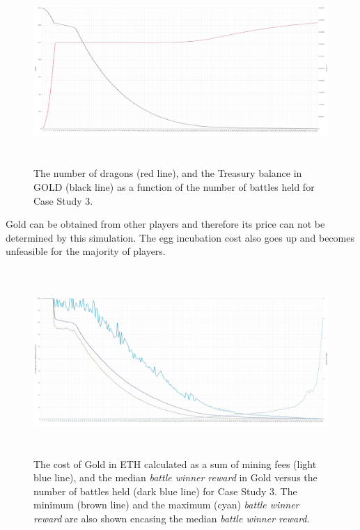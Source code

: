 \documentclass[12pt]{article}
\begin{document}
\begin{figure}[H]
	\begin{Center}
		\includegraphics[width=6.27in,height=2.78in]{./media/CS3nimage17.png}
		\caption{The number of dragons (red line), and the Treasury balance in GOLD (black line) as a function of the number of battles held for Case Study 3.}
		\label{fig:The number of dragons (red line), and the Treasury balance in Gold (black line) as a function of the number of battles held for Case Study 3.}
	\end{Center}
\end{figure}




Gold can be obtained from other players and therefore its price can not be determined by this simulation. The egg incubation cost also goes up and becomes unfeasible for the majority of players.\par




\begin{figure}[H]
	\begin{Center}
		\includegraphics[width=6.27in,height=2.78in]{./media/CS3nimage24.png}
        \caption{The cost of Gold in ETH calculated as a sum of mining fees (light blue line), and the median {\it battle winner reward} in Gold versus the number of battles held (dark blue line) for Case Study 3. The minimum (brown line) and the maximum (cyan) {\it battle winner reward} are also shown encasing the median {\it battle winner reward}.}
		\label{fig:The median battle reward in Gold versus the number of battles held (dark blue line) for Case Study 3.}
	\end{Center}
\end{figure}
\end{document}
